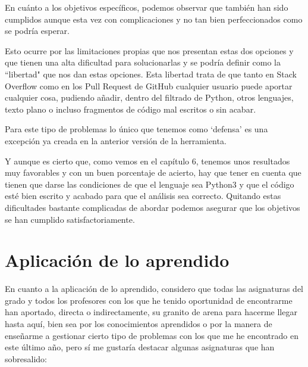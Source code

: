 \documentclass[a4paper, 12pt]{book}
\begin{document}
En cuánto a los objetivos específicos, podemos observar que también han sido cumplidos aunque esta vez con complicaciones y no tan bien perfeccionados como se podría esperar.

Esto ocurre por las limitaciones propias que nos presentan estas dos opciones y que tienen una alta dificultad para solucionarlas y se podría definir como la ``libertad" que nos dan estas opciones. Esta libertad trata de que tanto en Stack Overflow como en los Pull Request de GitHub cualquier usuario puede aportar cualquier cosa, pudiendo añadir, dentro del filtrado de Python, otros lenguajes, texto plano o incluso fragmentos de código mal escritos o sin acabar.

Para este tipo de problemas lo único que tenemos como `defensa' es una excepción ya creada en la anterior versión de la herramienta.

Y aunque es cierto que, como vemos en el capítulo 6, tenemos unos resultados muy favorables y con un buen porcentaje de acierto, hay que tener en cuenta que tienen que darse las condiciones de que el lenguaje sea Python3 y que el código esté bien escrito y acabado para que el análisis sea correcto. Quitando estas dificultades bastante complicadas de abordar podemos asegurar que los objetivos se han cumplido satisfactoriamente.

\section{Aplicación de lo aprendido}
\label{sec:aplicacion}

En cuanto a la aplicación de lo aprendido, considero que todas las asignaturas del grado y todos los profesores con los que he tenido oportunidad de encontrarme han aportado, directa o indirectamente, su granito de arena para hacerme llegar hasta aquí, bien sea por los conocimientos aprendidos o por la manera de enseñarme a gestionar cierto tipo de problemas con los que me he encontrado en este último año, pero sí me gustaría destacar algunas asignaturas que han sobresalido:
\end{document}
